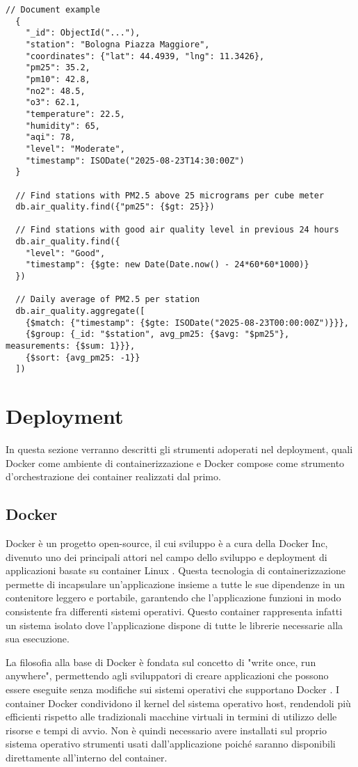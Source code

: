 \begin{lstlisting}[caption={Query MongoDB}, label=lst:mongodb]
  // Document example
  {
    "_id": ObjectId("..."),
    "station": "Bologna Piazza Maggiore",
    "coordinates": {"lat": 44.4939, "lng": 11.3426},
    "pm25": 35.2,
    "pm10": 42.8,
    "no2": 48.5,
    "o3": 62.1,
    "temperature": 22.5,
    "humidity": 65,
    "aqi": 78,
    "level": "Moderate",
    "timestamp": ISODate("2025-08-23T14:30:00Z")
  }

  // Find stations with PM2.5 above 25 micrograms per cube meter
  db.air_quality.find({"pm25": {$gt: 25}})

  // Find stations with good air quality level in previous 24 hours
  db.air_quality.find({
    "level": "Good",
    "timestamp": {$gte: new Date(Date.now() - 24*60*60*1000)}
  })

  // Daily average of PM2.5 per station
  db.air_quality.aggregate([
    {$match: {"timestamp": {$gte: ISODate("2025-08-23T00:00:00Z")}}},
    {$group: {_id: "$station", avg_pm25: {$avg: "$pm25"}, measurements: {$sum: 1}}},
    {$sort: {avg_pm25: -1}}
  ])
\end{lstlisting}

\section{Deployment}

In questa sezione verranno descritti gli strumenti adoperati nel deployment, quali Docker
come ambiente di containerizzazione e Docker compose come strumento d'orchestrazione dei container realizzati dal primo.

\subsection{Docker}

Docker è un progetto open-source, il cui sviluppo è a cura della Docker Inc, divenuto uno dei principali attori
nel campo dello sviluppo e deployment di applicazioni basate su container Linux \cite{mouat2015docker}.
Questa tecnologia di containerizzazione permette di incapsulare un'applicazione insieme a tutte le sue dipendenze
in un contenitore leggero e portabile, garantendo che l'applicazione funzioni in modo consistente fra differenti
sistemi operativi. Questo container rappresenta infatti un sistema isolato dove l'applicazione dispone di tutte
le librerie necessarie alla sua esecuzione.

La filosofia alla base di Docker è fondata sul concetto di "write once, run anywhere", permettendo agli sviluppatori
di creare applicazioni che possono essere eseguite senza modifiche sui sistemi operativi che supportano
Docker \cite{merkel2014docker}. I container Docker condividono il kernel del sistema operativo host, rendendoli
più efficienti rispetto alle tradizionali macchine virtuali in termini di utilizzo delle risorse e tempi di avvio.
Non è quindi necessario avere installati sul proprio sistema operativo strumenti usati dall'applicazione poiché
saranno disponibili direttamente all'interno del container.

